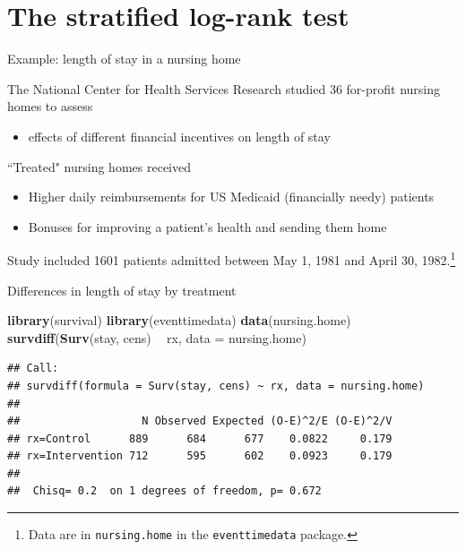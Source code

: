 \documentclass[ignorenonframetext,]{beamer}
\newenvironment{Shaded}{\begin{snugshade}}{\end{snugshade}}
\newcommand{\DataTypeTok}[1]{\textcolor[rgb]{0.13,0.29,0.53}{#1}}
\newcommand{\KeywordTok}[1]{\textcolor[rgb]{0.13,0.29,0.53}{\textbf{#1}}}
\newcommand{\NormalTok}[1]{#1}
\newcommand{\OperatorTok}[1]{\textcolor[rgb]{0.81,0.36,0.00}{\textbf{#1}}}
\newcommand{\StringTok}[1]{\textcolor[rgb]{0.31,0.60,0.02}{#1}}
\providecommand{\tightlist}{%
  \setlength{\itemsep}{0pt}\setlength{\parskip}{0pt}}
\begin{document}
\hypertarget{the-stratified-log-rank-test}{%
\section{The stratified log-rank
test}\label{the-stratified-log-rank-test}}

\begin{frame}{%
\protect\hypertarget{example-length-of-stay-in-a-nursing-home}{%
Example: length of stay in a nursing home}}

The National Center for Health Services Research studied 36 for-profit
nursing homes to assess

\begin{itemize}
\tightlist
\item
  effects of different financial incentives on length of stay
\end{itemize}

``Treated" nursing homes received

\begin{itemize}
\item
  Higher daily reimbursements for US Medicaid (financially needy)
  patients
\item
  Bonuses for improving a patient’s health and sending them home
\end{itemize}

Study included 1601 patients admitted between May 1, 1981 and April 30,
1982.\footnote{Data are in \texttt{nursing.home} in the \texttt{eventtimedata} package.}

\end{frame}

\begin{frame}[fragile]{%
\protect\hypertarget{differences-in-length-of-stay-by-treatment}{%
Differences in length of stay by treatment}}

\footnotesize

\begin{Shaded}
\begin{Highlighting}[]
\KeywordTok{library}\NormalTok{(survival)}
\KeywordTok{library}\NormalTok{(eventtimedata)}
\KeywordTok{data}\NormalTok{(nursing.home)}
\KeywordTok{survdiff}\NormalTok{(}\KeywordTok{Surv}\NormalTok{(stay, cens) }\OperatorTok{~}\StringTok{ }\NormalTok{rx, }\DataTypeTok{data =}\NormalTok{ nursing.home)}
\end{Highlighting}
\end{Shaded}

\begin{verbatim}
## Call:
## survdiff(formula = Surv(stay, cens) ~ rx, data = nursing.home)
## 
##                   N Observed Expected (O-E)^2/E (O-E)^2/V
## rx=Control      889      684      677    0.0822     0.179
## rx=Intervention 712      595      602    0.0923     0.179
## 
##  Chisq= 0.2  on 1 degrees of freedom, p= 0.672
\end{verbatim}

\end{frame}
\end{document}
